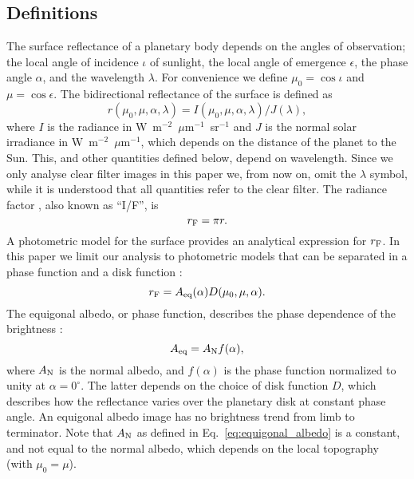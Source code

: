 \documentclass[3p,authoryear]{elsarticle}
\begin{document}
\subsection{Definitions}

The surface reflectance of a planetary body depends on the angles of observation; the local angle of incidence $\iota$ of sunlight, the local angle of emergence $\epsilon$, the phase angle $\alpha$, and the wavelength $\lambda$. For convenience we define $\mu_0 = \cos\iota$ and $\mu = \cos\epsilon$. The bidirectional reflectance of the surface is defined as
\begin{equation}
r({\mu_0, \mu}, \alpha, \lambda) = I({\mu_0, \mu}, \alpha, \lambda) / J(\lambda),
\label{eq:reflectance}
\end{equation}
where $I$ is the radiance in W~m$^{-2}$~$\mu$m$^{-1}$~sr$^{-1}$ and $J$ is the normal solar irradiance in W~m$^{-2}$~$\mu$m$^{-1}$, which depends on the distance of the planet to the Sun. This, and other quantities defined below, depend on wavelength. Since we only analyse clear filter images in this paper we, from now on, omit the $\lambda$ symbol, while it is understood that all quantities refer to the clear filter. The radiance factor \citep{H81}, also known as ``I/F'', is
\begin{equation}
r_{\rm F} = \pi r.
\label{eq:rad_fac}
\end{equation}
A photometric model for the surface provides an analytical expression for $r_{\rm F}$. In this paper we limit our analysis to photometric models that can be separated in a phase function and a disk function \citep{K01,S11}:
\begin{equation}
r_{\rm F} = A_{\rm eq}(\alpha) D(\mu_0, \mu, \alpha).
\label{eq:eq_albedo}
\end{equation}
The equigonal albedo, or phase function, describes the phase dependence of the brightness \citep{S11}:
\begin{equation}
A_{\rm eq} = A_{\rm N} f(\alpha),
\label{eq:equigonal_albedo}
\end{equation}
where $A_{\rm N}$ is the normal albedo, and $f(\alpha)$ is the phase function normalized to unity at $\alpha = 0^\circ$. The latter depends on the choice of disk function $D$, which describes how the reflectance varies over the planetary disk at constant phase angle. An equigonal albedo image has no brightness trend from limb to terminator. Note that $A_{\rm N}$ as defined in Eq.~\ref{eq:equigonal_albedo} is a constant, and not equal to the \citet{H81} normal albedo, which depends on the local topography (with $\mu_0 = \mu$).
\end{document}

